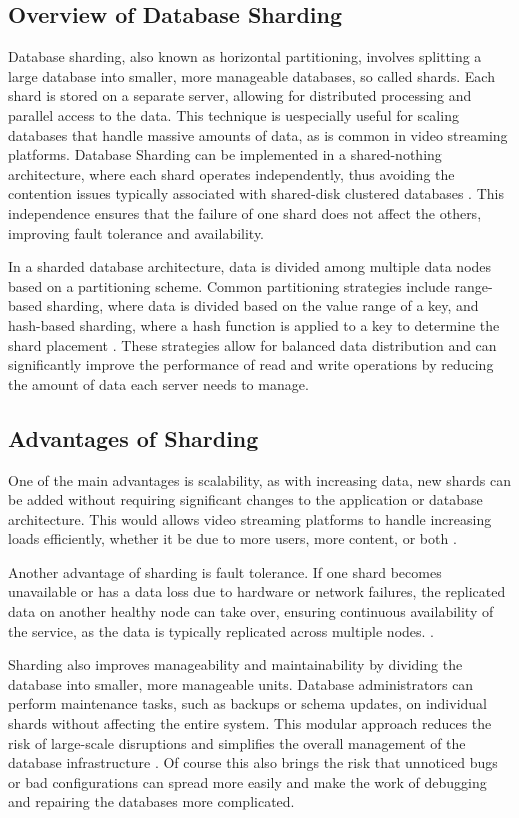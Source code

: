\subsection{Overview of Database Sharding}
Database sharding, also known as horizontal partitioning, involves splitting a large database into smaller, more manageable databases, so called shards. Each shard is stored on a separate server, allowing for distributed processing and parallel access to the data. This technique is uespecially useful for scaling databases that handle massive amounts of data, as is common in video streaming platforms. Database Sharding can be implemented in a shared-nothing architecture, where each shard operates independently, thus avoiding the contention issues typically associated with shared-disk clustered databases \cite{DBsharding}. This independence ensures that the failure of one shard does not affect the others, improving fault tolerance and availability.

In a sharded database architecture, data is divided among multiple data nodes based on a partitioning scheme. Common partitioning strategies include range-based sharding, where data is divided based on the value range of a key, and hash-based sharding, where a hash function is applied to a key to determine the shard placement \cite{DatabaseSharding}. These strategies allow for balanced data distribution and can significantly improve the performance of read and write operations by reducing the amount of data each server needs to manage.

\subsection{Advantages of Sharding}
One of the main advantages is scalability, as with increasing data, new shards can be added without requiring significant changes to the application or database architecture. This would allows video streaming platforms to handle increasing loads efficiently, whether it be due to more users, more content, or both \cite{DBsharding}.

Another advantage of sharding is fault tolerance. If one shard becomes unavailable or has a data loss due to hardware or network failures, the replicated data on another healthy node can take over, ensuring continuous availability of the service, as the data is typically replicated across multiple nodes. \cite{DBsharding}.

Sharding also improves manageability and maintainability by dividing the database into smaller, more manageable units. Database administrators can perform maintenance tasks, such as backups or schema updates, on individual shards without affecting the entire system. This modular approach reduces the risk of large-scale disruptions and simplifies the overall management of the database infrastructure \cite{DatabaseSharding}. Of course this also brings the risk that unnoticed bugs or bad configurations can spread more easily and make the work of debugging and repairing the databases more complicated. 

